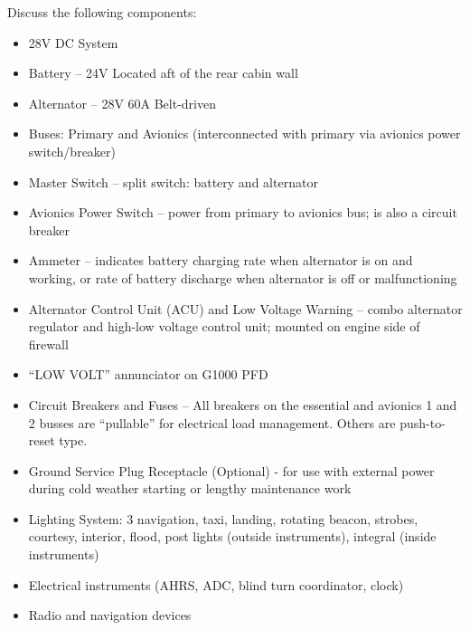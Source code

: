 Discuss the following components:
\begin{itemize}
  \item 28V DC System

  \item Battery -- 24V Located aft of the rear cabin wall

  \item Alternator -- 28V 60A Belt-driven

  \item Buses: Primary and Avionics (interconnected with primary via avionics
    power switch/breaker)

  \item Master Switch -- split switch: battery and alternator

  \item Avionics Power Switch -- power from primary to avionics bus; is also a
    circuit breaker

  \item Ammeter -- indicates battery charging rate when alternator is on and
    working, or rate of battery discharge when alternator is off or
    malfunctioning

  \item Alternator Control Unit (ACU) and Low Voltage Warning -- combo alternator
    regulator and high-low voltage control unit; mounted on engine side of
    firewall

  \item ``LOW VOLT'' annunciator on G1000 PFD

  \item Circuit Breakers and Fuses -- All breakers on the essential and
    avionics 1 and 2 busses are ``pullable'' for electrical load management.
    Others are push-to-reset type.

  \item Ground Service Plug Receptacle (Optional) - for use with external power
    during cold weather starting or lengthy maintenance work

  \item Lighting System: 3 navigation, taxi, landing, rotating beacon, strobes,
    courtesy, interior, flood, post lights (outside instruments), integral
    (inside instruments)

  \item Electrical instruments (AHRS, ADC, blind turn coordinator, clock)

  \item Radio and navigation devices
\end{itemize}

